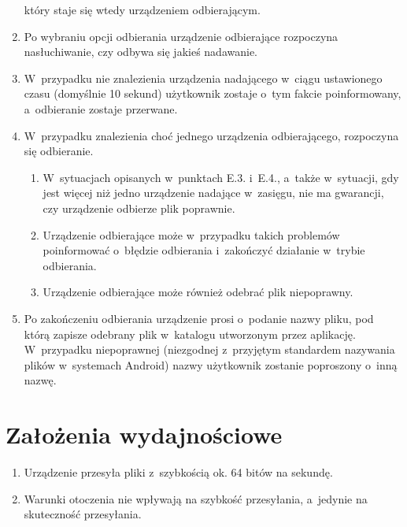 \documentclass{article}
\begin{document}
\begin{enumerate}
              który staje się wtedy urządzeniem odbierającym.
        \item Po wybraniu opcji odbierania urządzenie odbierające rozpoczyna 
              nasłuchiwanie, czy odbywa się jakieś nadawanie.
        \item W~przypadku nie znalezienia urządzenia nadającego w~ciągu 
              ustawionego czasu (domyślnie 10 sekund) użytkownik zostaje o~tym 
              fakcie poinformowany, a~odbieranie zostaje przerwane.
        \item W~przypadku znalezienia choć jednego urządzenia odbierającego, 
              rozpoczyna się odbieranie.
            \begin{enumerate}
                \item W~sytuacjach opisanych w~punktach E.3. i~E.4., a~także 
                      w~sytuacji, gdy jest więcej niż jedno urządzenie nadające 
                      w~zasięgu, nie ma gwarancji, czy urządzenie odbierze plik 
                      poprawnie.
                \item Urządzenie odbierające może w~przypadku takich problemów 
                      poinformować o~błędzie odbierania i~zakończyć działanie 
                      w~trybie odbierania.
                \item Urządzenie odbierające może również odebrać plik niepoprawny.
            \end{enumerate}
        \item Po zakończeniu odbierania urządzenie prosi o~podanie nazwy pliku, 
              pod którą zapisze odebrany plik w~katalogu utworzonym przez aplikację. 
              W~przypadku niepoprawnej (niezgodnej z~przyjętym standardem nazywania 
              plików w~systemach Android) nazwy użytkownik zostanie poproszony 
              o~inną nazwę.
    \end{enumerate}

\section{Założenia wydajnościowe}
    \begin{enumerate}
        \item Urządzenie przesyła pliki z~szybkością ok. 64 bitów na sekundę.
        \item Warunki otoczenia nie wpływają na szybkość przesyłania, a~jedynie 
              na skuteczność przesyłania.
    \end{enumerate}
        
\end{document}
